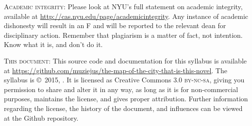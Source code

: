 \begin{description}
  \item \textsc{Academic integrity:} Please look at NYU’s full statement on
    academic integrity, available at \url{http://cas.nyu.edu/page/academicintegrity}.
    Any instance of academic dishonesty will result in an F and will be
    reported to the relevant dean for disciplinary action. Remember that
    plagiarism is a matter of fact, not intention. Know what it is, and don’t
    do it.

  \item \textsc{This document:} This source code and documentation for this
    syllabus is available at
    \url{https://github.com/muziejus/the-map-of-the-city-that-is-this-novel}.
    The syllabus is \copyright\ 2015, \myauthor. It is licensed as Creative
    Commons 3.0 \textsc{by-nc-sa}, giving you permission to share and alter it
    in any way, as long as it is for non-commercial purposes, maintains the
    license, and gives proper attribution. Further information regarding the
    license, the history of the document, and influences can be viewed
    at the Github repository.

\end{description}
